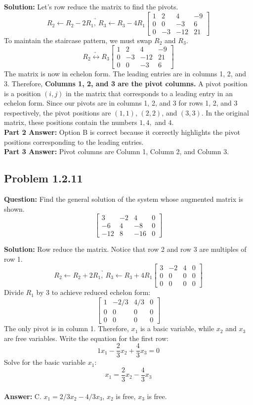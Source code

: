 \documentclass[11pt]{article}
\begin{document}
\textbf{Solution:}
Let's row reduce the matrix to find the pivots.
\[ \underrightarrow{R_2 \leftarrow R_2 - 2R_1, \ R_3 \leftarrow R_3 - 4R_1} \begin{bmatrix} 1 & 2 & 4 & -9 \\ 0 & 0 & -3 & 6 \\ 0 & -3 & -12 & 21 \end{bmatrix} \]
To maintain the staircase pattern, we must swap $R_2$ and $R_3$.
\[ \underrightarrow{R_2 \leftrightarrow R_3} \begin{bmatrix} 1 & 2 & 4 & -9 \\ 0 & -3 & -12 & 21 \\ 0 & 0 & -3 & 6 \end{bmatrix} \]
The matrix is now in echelon form. The leading entries are in columns 1, 2, and 3. Therefore, \textbf{Columns 1, 2, and 3 are the pivot columns.}
A pivot position is a position $(i, j)$ in the matrix that corresponds to a leading entry in an echelon form. Since our pivots are in columns 1, 2, and 3 for rows 1, 2, and 3 respectively, the pivot positions are $(1,1)$, $(2,2)$, and $(3,3)$. 
In the original matrix, these positions contain the numbers $1, 4,$ and $4$.
\\
\textbf{Part 2 Answer:} Option B is correct because it correctly highlights the pivot positions corresponding to the leading entries. \\
\textbf{Part 3 Answer:} Pivot columns are Column 1, Column 2, and Column 3.


\subsection*{Problem 1.2.11}
\textbf{Question:} Find the general solution of the system whose augmented matrix is shown.
\[ \begin{bmatrix} 3 & -2 & 4 & 0 \\ -6 & 4 & -8 & 0 \\ -12 & 8 & -16 & 0 \end{bmatrix} \]

\textbf{Solution:}
Row reduce the matrix. Notice that row 2 and row 3 are multiples of row 1.
\[ \underrightarrow{R_2 \leftarrow R_2 + 2R_1, \ R_3 \leftarrow R_3 + 4R_1} \begin{bmatrix} 3 & -2 & 4 & 0 \\ 0 & 0 & 0 & 0 \\ 0 & 0 & 0 & 0 \end{bmatrix} \]
Divide $R_1$ by $3$ to achieve reduced echelon form:
\[ \begin{bmatrix} 1 & -2/3 & 4/3 & 0 \\ 0 & 0 & 0 & 0 \\ 0 & 0 & 0 & 0 \end{bmatrix} \]
The only pivot is in column 1. Therefore, $x_1$ is a basic variable, while $x_2$ and $x_3$ are free variables. 
Write the equation for the first row:
\[ 1x_1 - \frac{2}{3}x_2 + \frac{4}{3}x_3 = 0 \]
Solve for the basic variable $x_1$:
\[ x_1 = \frac{2}{3}x_2 - \frac{4}{3}x_3 \]
\\
\textbf{Answer:} C. $x_1 = 2/3x_2 - 4/3x_3$, $x_2$ is free, $x_3$ is free.
\end{document}
